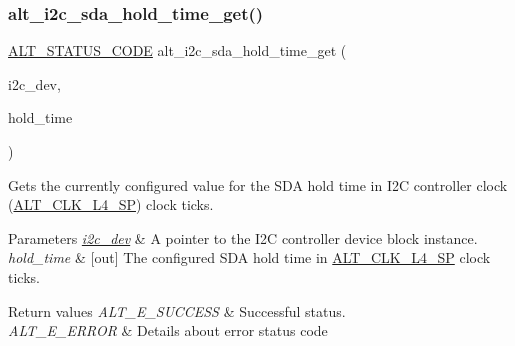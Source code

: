 \subsubsection{\texorpdfstring{alt\_i2c\_sda\_hold\_time\_get()}{alt\_i2c\_sda\_hold\_time\_get()}}
{\footnotesize\ttfamily \mbox{\hyperlink{hwlib_8h_abdb0d369f069723ca55d6c94bcaaaa12}{A\+L\+T\+\_\+\+S\+T\+A\+T\+U\+S\+\_\+\+C\+O\+DE}} alt\+\_\+i2c\+\_\+sda\+\_\+hold\+\_\+time\+\_\+get (\begin{DoxyParamCaption}\item[{\mbox{\hyperlink{structALT__I2C__DEV__s}{A\+L\+T\+\_\+\+I2\+C\+\_\+\+D\+E\+V\+\_\+t}} $\ast$}]{i2c\+\_\+dev,  }\item[{uint16\+\_\+t $\ast$}]{hold\+\_\+time }\end{DoxyParamCaption})}

Gets the currently configured value for the S\+DA hold time in I2C controller clock (\mbox{\hyperlink{group__CLK__MGR_gga931510957187a22cb4e6adef8d9d105aae9f1cc0f4be2861d830cb5e38daec823}{A\+L\+T\+\_\+\+C\+L\+K\+\_\+\+L4\+\_\+\+SP}}) clock ticks.


\begin{DoxyParams}{Parameters}
{\em \mbox{\hyperlink{structi2c__dev}{i2c\+\_\+dev}}} & A pointer to the I2C controller device block instance.\\
\hline
{\em hold\+\_\+time} & \mbox{[}out\mbox{]} The configured S\+DA hold time in \mbox{\hyperlink{group__CLK__MGR_gga931510957187a22cb4e6adef8d9d105aae9f1cc0f4be2861d830cb5e38daec823}{A\+L\+T\+\_\+\+C\+L\+K\+\_\+\+L4\+\_\+\+SP}} clock ticks.\\
\hline
\end{DoxyParams}

\begin{DoxyRetVals}{Return values}
{\em A\+L\+T\+\_\+\+E\+\_\+\+S\+U\+C\+C\+E\+SS} & Successful status. \\
\hline
{\em A\+L\+T\+\_\+\+E\+\_\+\+E\+R\+R\+OR} & Details about error status code \\
\hline
\end{DoxyRetVals}
\mbox{\label{group__ALT__I2C__SDA__HOLD_ga9e5a55cd63be05ba095bb53448c1aeee}} 
